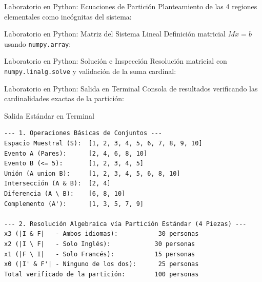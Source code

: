 \documentclass[10pt,aspectratio=169]{beamer}
\begin{document}
\begin{frame}[fragile]{Laboratorio en Python: Ecuaciones de Partición}
  Planteamiento de las 4 regiones elementales como incógnitas del sistema:
  \vspace{0.1em}
  {
  }
\end{frame}

\begin{frame}[fragile]{Laboratorio en Python: Matriz del Sistema Lineal}
  Definición matricial $M x = b$ usando \texttt{numpy.array}:
  \vspace{0.1em}
  {
  }
\end{frame}

\begin{frame}[fragile]{Laboratorio en Python: Solución e Inspección}
  Resolución matricial con \texttt{numpy.linalg.solve} y validación de la suma cardinal:
  \vspace{0.1em}
  {
  }
\end{frame}

\begin{frame}[fragile]{Laboratorio en Python: Salida en Terminal}
  Consola de resultados verificando las cardinalidades exactas de la partición:
  \vspace{0.1em}
  \begin{block}{Salida Estándar en Terminal}
    \fontsize{6.5pt}{7.5pt}\selectfont
    \begin{verbatim}
--- 1. Operaciones Básicas de Conjuntos ---
Espacio Muestral (S):  [1, 2, 3, 4, 5, 6, 7, 8, 9, 10]
Evento A (Pares):      [2, 4, 6, 8, 10]
Evento B (<= 5):       [1, 2, 3, 4, 5]
Unión (A union B):     [1, 2, 3, 4, 5, 6, 8, 10]
Intersección (A & B):  [2, 4]
Diferencia (A \ B):    [6, 8, 10]
Complemento (A'):      [1, 3, 5, 7, 9]

--- 2. Resolución Algebraica vía Partición Estándar (4 Piezas) ---
x3 (|I & F|   - Ambos idiomas):           30 personas
x2 (|I \ F|   - Solo Inglés):            30 personas
x1 (|F \ I|   - Solo Francés):           15 personas
x0 (|I' & F'| - Ninguno de los dos):      25 personas
Total verificado de la partición:        100 personas
    \end{verbatim}
  \end{block}
\end{frame}
\end{document}
